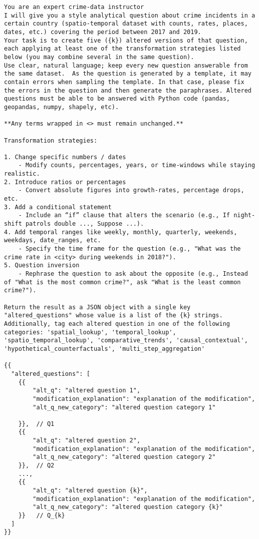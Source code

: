 \begin{lstlisting}[style=customprompt,caption={Prompt for generating altered questions},label={prompt:question_augmentation}]
You are an expert crime-data instructor
I will give you a style analytical question about crime incidents in a certain country (spatio‑temporal dataset with counts, rates, places, dates, etc.) covering the period between 2017 and 2019.
Your task is to create five ({k}) altered versions of that question, each applying at least one of the transformation strategies listed below (you may combine several in the same question).
Use clear, natural language; keep every new question answerable from the same dataset.  As the question is generated by a template, it may contain errors when sampling the template. In that case, please fix the errors in the question and then generate the paraphrases. Altered questions must be able to be answered with Python code (pandas, geopandas, numpy, shapely, etc).

**Any terms wrapped in <> must remain unchanged.**

Transformation strategies:

1. Change specific numbers / dates
    - Modify counts, percentages, years, or time‑windows while staying realistic.
2. Introduce ratios or percentages
    - Convert absolute figures into growth‑rates, percentage drops, etc.
3. Add a conditional statement
    - Include an “if” clause that alters the scenario (e.g., If night-shift patrols double ..., Suppose ...).
4. Add temporal ranges like weekly, monthly, quarterly, weekends, weekdays, date_ranges, etc.
    - Specify the time frame for the question (e.g., "What was the crime rate in <city> during weekends in 2018?").
5. Question inversion
    - Rephrase the question to ask about the opposite (e.g., Instead of "What is the most common crime?", ask "What is the least common crime?").

Return the result as a JSON object with a single key "altered_questions" whose value is a list of the {k} strings. Additionally, tag each altered question in one of the following categories: 'spatial_lookup', 'temporal_lookup', 'spatio_temporal_lookup', 'comparative_trends', 'causal_contextual', 'hypothetical_counterfactuals', 'multi_step_aggregation'

{{
  "altered_questions": [
    {{
        "alt_q": "altered question 1",
        "modification_explanation": "explanation of the modification",
        "alt_q_new_category": "altered question category 1"

    }},  // Q1
    {{
        "alt_q": "altered question 2",
        "modification_explanation": "explanation of the modification",
        "alt_q_new_category": "altered question category 2"
    }},  // Q2
    ...,
    {{
        "alt_q": "altered question {k}",
        "modification_explanation": "explanation of the modification",
        "alt_q_new_category": "altered question category {k}"
    }}   // Q_{k}
  ]
}}
\end{lstlisting}



